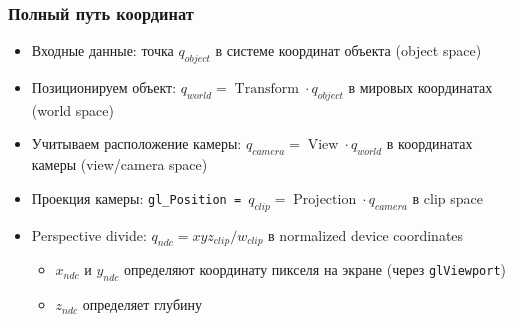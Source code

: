 \documentclass{beamer}
\begin{document}
\begin{frame}[fragile]
\frametitle{Полный путь координат}
\begin{itemize}
\item Входные данные: точка \begin{math}q_{object}\end{math} в системе координат объекта (object space)
\pause
\item Позиционируем объект: \begin{math}q_{world} = \operatorname{Transform} \cdot q_{object}\end{math} в мировых координатах (world space)
\pause
\item Учитываем расположение камеры: \begin{math}q_{camera} = \operatorname{View} \cdot q_{world}\end{math} в координатах камеры (view/camera space)
\pause
\item Проекция камеры: \verb|gl_Position = |\begin{math}q_{clip} = \operatorname{Projection} \cdot q_{camera}\end{math} в clip space
\pause
\item Perspective divide: \begin{math}q_{ndc} = xyz_{clip} / w_{clip}\end{math} в normalized device coordinates
\pause
\begin{itemize}
\item \begin{math}x_{ndc}\end{math} и \begin{math}y_{ndc}\end{math} определяют координату пикселя на экране (через \verb|glViewport|)
\item \begin{math}z_{ndc}\end{math} определяет глубину
\end{itemize}
\end{itemize}
\end{frame}
\end{document}
